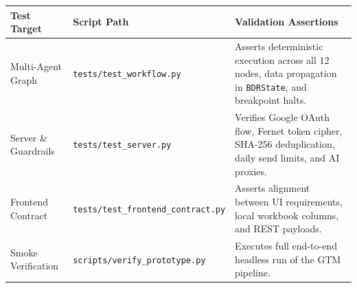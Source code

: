 \documentclass[10pt,letterpaper]{article}
\begin{document}
\begin{table}[h!]
\centering
\scriptsize
\begin{tabularx}{\textwidth}{l p{3.5cm} X}
\toprule
\textbf{Test Target} & \textbf{Script Path} & \textbf{Validation Assertions} \\
\midrule
Multi-Agent Graph & \texttt{tests/test\_workflow.py} & Asserts deterministic execution across all 12 nodes, data propagation in \texttt{BDRState}, and breakpoint halts. \\
Server \& Guardrails & \texttt{tests/test\_server.py} & Verifies Google OAuth flow, Fernet token cipher, SHA-256 deduplication, daily send limits, and AI proxies. \\
Frontend Contract & \texttt{tests/test\_frontend\_contract.py} & Asserts alignment between UI requirements, local workbook columns, and REST payloads. \\
Smoke Verification & \texttt{scripts/verify\_prototype.py} & Executes full end-to-end headless run of the GTM pipeline. \\
\bottomrule
\end{tabularx}
\end{table}
\end{document}
